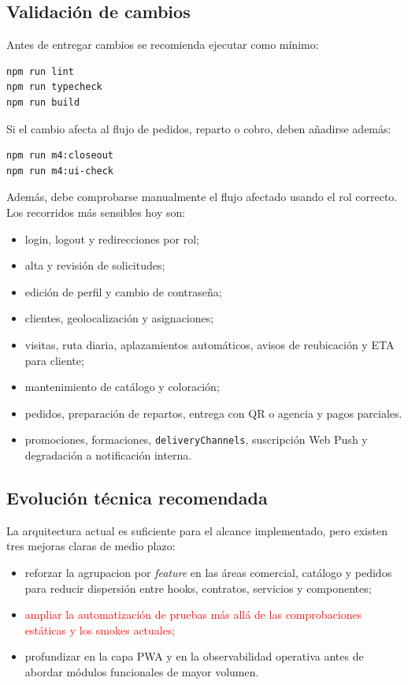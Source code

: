 \subsection{Validación de cambios}

Antes de entregar cambios se recomienda ejecutar como mínimo:

\begin{lstlisting}[language=bash]
npm run lint
npm run typecheck
npm run build
\end{lstlisting}

Si el cambio afecta al flujo de pedidos, reparto o cobro, deben añadirse además:

\begin{lstlisting}[language=bash]
npm run m4:closeout
npm run m4:ui-check
\end{lstlisting}

Además, debe comprobarse manualmente el flujo afectado usando el rol correcto. Los recorridos más sensibles hoy son:

\begin{itemize}
    \item login, logout y redirecciones por rol;
    \item alta y revisión de solicitudes;
    \item edición de perfil y cambio de contraseña;
    \item clientes, geolocalización y asignaciones;
    \item visitas, ruta diaria, aplazamientos automáticos, avisos de reubicación y ETA para cliente;
    \item mantenimiento de catálogo y coloración;
    \item pedidos, preparación de repartos, entrega con QR o agencia y pagos parciales.
    \item promociones, formaciones, \texttt{deliveryChannels}, suscripción Web Push y degradación a notificación interna.
\end{itemize}

\subsection{Evolución técnica recomendada}

La arquitectura actual es suficiente para el alcance implementado, pero existen tres mejoras claras de medio plazo:

\begin{itemize}
    \item reforzar la agrupacion por \textit{feature} en las áreas comercial, catálogo y pedidos para reducir dispersión entre hooks, contratos, servicios y componentes;
    \item \textcolor{red}{ampliar la automatización de pruebas más allá de las comprobaciones estáticas y los smokes actuales;}
    \item profundizar en la capa PWA y en la observabilidad operativa antes de abordar módulos funcionales de mayor volumen.
\end{itemize}

